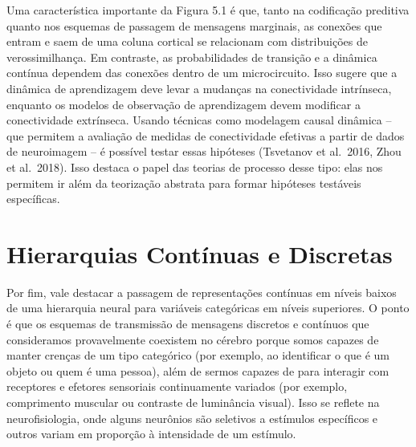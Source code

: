 \documentclass[
  12pt,
]{book}
\begin{document}
\hfill\break
Uma característica importante da Figura 5.1 é que, tanto na codificação preditiva quanto nos esquemas de passagem de mensagens marginais, as conexões que entram e saem de uma coluna cortical se relacionam com distribuições de verossimilhança. Em contraste, as probabilidades de transição e a dinâmica contínua dependem das conexões dentro de um microcircuito. Isso sugere que a dinâmica de aprendizagem deve levar a mudanças na conectividade intrínseca, enquanto os modelos de observação de aprendizagem devem modificar a conectividade extrínseca. Usando técnicas como modelagem causal dinâmica -- que permitem a avaliação de medidas de conectividade efetivas a partir de dados de neuroimagem -- é possível testar essas hipóteses (Tsvetanov et al.~2016, Zhou et al.~2018). Isso destaca o papel das teorias de processo desse tipo: elas nos permitem ir além da teorização abstrata para formar hipóteses testáveis específicas.

\hfill\break

\hypertarget{hierarquias-contuxednuas-e-discretas}{%
\section{Hierarquias Contínuas e Discretas}\label{hierarquias-contuxednuas-e-discretas}}

Por fim, vale destacar a passagem de representações contínuas em níveis baixos de uma hierarquia neural para variáveis categóricas em níveis superiores. O ponto é que os esquemas de transmissão de mensagens discretos e contínuos que consideramos provavelmente coexistem no cérebro porque somos capazes de manter crenças de um tipo categórico (por exemplo, ao identificar o que é um objeto ou quem é uma pessoa), além de sermos capazes de para interagir com receptores e efetores sensoriais continuamente variados (por exemplo, comprimento muscular ou contraste de luminância visual). Isso se reflete na neurofisiologia, onde alguns neurônios são seletivos a estímulos específicos e outros variam em proporção à intensidade de um estímulo.
\end{document}
